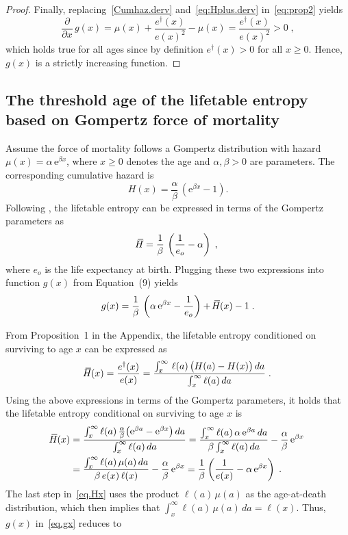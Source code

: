 \documentclass[a4paper,twoside, openright, 12pt, leqno]{article}
\newcommand*\xbar[1]{%
   \hbox{%
     \vbox{%
       \hrule height 0.5pt %
       \kern0.3ex%
       \hbox{%
         \kern-0.28em%
         \ensuremath{#1}%
         \kern-0.05em%
       }%
     }%
   }%
}
\begin{document}
\begin{proof}
Finally, replacing~\eqref{Cumhaz.derv} and~\eqref{eq:Hplus.derv} in~\eqref{eq:prop2} yields
%
\begin{equation*}
 \frac{\partial}{\partial x}\,g(x)=\mu(x)+\frac{e^\dagger(x)}{e(x)^2}-\mu(x)=\frac{e^\dagger(x)}{e(x)^2}>0\;,
\end{equation*}
%
which holds true for all ages since by definition $e^\dagger(x)>0$ for all $x\geq0$. Hence, $g(x)$ is a strictly increasing function.
\end{proof}

\subsection*{The threshold age of the lifetable entropy based on Gompertz force of mortality}

Assume the force of mortality follows a Gompertz distribution with hazard $\mu(x) = \alpha\,\mathrm{e}^{\beta x}$, where $x\geq0$ denotes the age and $\alpha,\beta>0$ are parameters. The corresponding cumulative hazard is 
$$
H(x)=\frac{\alpha}{\beta}\,\left(\mathrm{e}^{\beta x} - 1 \right).
$$
Following \cite{wrycza2014entropy}, the lifetable entropy can be expressed in terms of the Gompertz parameters as
$$
\xbar{H}=\frac{1}{\beta}\,\left(\frac{1}{e_o}-\alpha\right)\;,
$$
where $e_o$ is the life expectancy at birth. Plugging these two expressions into function $g(x)$ from Equation~(9) yields
\begin{equation}
g(x) = \frac{1}{\beta}\,\left(\alpha\,\mathrm{e}^{\beta x} - \frac{1}{e_o} \right)+\,\xbar{H}(x)-1\;.
\label{eq.gx}
\end{equation}

From Proposition~1 in the Appendix, the lifetable entropy conditioned on surviving to age $x$ can be expressed as
$$
\xbar{H}(x)=\frac{e^\dagger(x)}{e(x)}=\frac{\int_x^\infty\,\ell(a)\,\big(H(a)-H(x)\big)\,da}{\int_x^\infty\ell(a)\,da}\;.
$$
Using the above expressions in terms of the Gompertz parameters, it holds that the lifetable entropy conditional on surviving to age $x$ is
%
\begin{equation}
  \begin{split}
	\xbar{H}(x)
        & = \frac{\int_x^\infty \ell(a)\,\frac{\alpha}{\beta}\big(\mathrm{e}^{\beta a}-\mathrm{e}^{\beta x}\big)\,da}{\int_x^\infty\ell(a)\,da}=\frac{\int_x^\infty \ell(a)\,\alpha\,\mathrm{e}^{\beta a}\,da}{\beta\int_x^\infty\ell(a)\,da} - \frac{\alpha}{\beta}\,\mathrm{e}^{\beta x} 				\\
        & = \frac{\int_x^\infty\ell(a)\,\mu(a)\,da}{\beta\,e(x)\,\ell(x)} - \frac{\alpha}{\beta}\,\mathrm{e}^{\beta x}=\frac{1}{\beta}\left(\frac{1}{e(x)}-\alpha\,\mathrm{e}^{\beta x}\right)\;.
  \end{split}
  \label{eq.Hx}
\end{equation}
%
The last step in~\eqref{eq.Hx} uses the product $\ell(a)\,\mu(a)$ as the age-at-death distribution, which then implies that $\int_x^\infty \ell(a)\,\mu(a)\,da=\ell(x)$. Thus, $g(x)$ in~\eqref{eq.gx} reduces to
\end{document}
